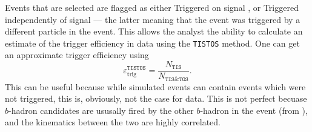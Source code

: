 Events that are selected are flagged as either
Triggered on signal \tos, or
Triggered independently of signal \tis --- the latter meaning that the event was triggered by
a different particle in the event.
This allows the analyst the ability to calculate an estimate of the trigger efficiency in data
using the {\tt TISTOS} method.
One can get an approximate trigger efficiency using
\begin{equation}
  \varepsilon_\mathrm{trig}^\mathtt{TISTOS} =
  \frac{N_\mathtt{TIS}}{N_\mathtt{TIS\&TOS}}.
\end{equation}
This can be useful because while simulated events can contain events which were not triggered, this
is, obviously, not the case for data.
This is not perfect becuase \tis $b$-hadron candidates are ususally fired by the other $b$-hadron
in the event (from ), and the kinematics between the two are highly correlated.



